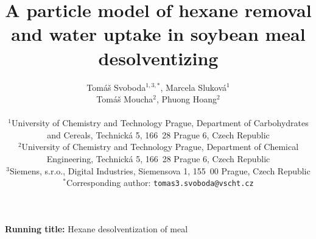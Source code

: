\documentclass[11pt]{article}
\begin{document}
\title{A particle model of hexane removal and water uptake in soybean meal
desolventizing}

\author{Tom\'a\v{s} Svoboda$^{1,3,*}$, Marcela Slukov\'a$^{1}$\\
Tom\'a\v{s} Moucha$^{2}$, Phuong Hoang$^{2}$\\[6pt]
\parbox{0.88\textwidth}{\raggedright\normalsize
$^{1}$University of Chemistry and Technology Prague, Department of Carbohydrates and Cereals, Technick\'a 5, 166~28 Prague 6, Czech Republic\\[2pt]
$^{2}$University of Chemistry and Technology Prague, Department of Chemical Engineering, Technick\'a 5, 166~28 Prague 6, Czech Republic\\[2pt]
$^{3}$Siemens, s.r.o., Digital Industries, Siemensova 1, 155~00 Prague, Czech Republic\\[2pt]
$^{*}$Corresponding author: \texttt{tomas3.svoboda@vscht.cz}}}

\date{}

\maketitle

\noindent\textbf{Running title:} Hexane desolventization of meal
\end{document}
